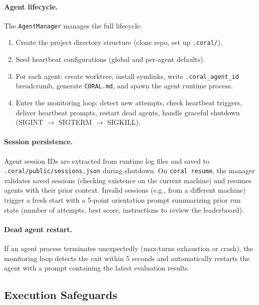 \paragraph{Agent lifecycle.} The \texttt{AgentManager} manages the full lifecycle:
\begin{enumerate}[nosep,leftmargin=*]
    \item Create the project directory structure (clone repo, set up \texttt{.coral/}).
    \item Seed heartbeat configurations (global and per-agent defaults).
    \item For each agent: create worktree, install symlinks, write \texttt{.coral\_agent\_id} breadcrumb, generate \texttt{CORAL.md}, and spawn the agent runtime process.
    \item Enter the monitoring loop: detect new attempts, check heartbeat triggers, deliver heartbeat prompts, restart dead agents, handle graceful shutdown (SIGINT $\to$ SIGTERM $\to$ SIGKILL).
\end{enumerate}

\paragraph{Session persistence.} Agent session IDs are extracted from runtime log files and saved to \texttt{.coral/public/sessions.json} during shutdown. On \texttt{coral resume}, the manager validates saved sessions (checking existence on the current machine) and resumes agents with their prior context. Invalid sessions (e.g., from a different machine) trigger a fresh start with a 5-point orientation prompt summarizing prior run state (number of attempts, best score, instructions to review the leaderboard).

\paragraph{Dead agent restart.} If an agent process terminates unexpectedly (max-turns exhaustion or crash), the monitoring loop detects the exit within 5 seconds and automatically restarts the agent with a prompt containing the latest evaluation results.

\subsection{Execution Safeguards}
\label{app:safeguards}

